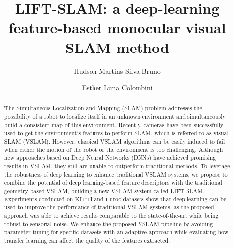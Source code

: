 \documentclass[preprint,12pt]{elsarticle}
\begin{document}
\begin{frontmatter}



\title{LIFT-SLAM: a deep-learning feature-based monocular visual SLAM method}


\author[label1]{Hudson Martins Silva Bruno}
\author[label1]{Esther Luna Colombini}

\address[label1]{Laboratory of Robotics and Cognitive Systems, Institute of Computing, State University of Campinas, Campinas, São Paulo, Brazil}
 
\begin{abstract}
The Simultaneous Localization and Mapping (SLAM) problem addresses the possibility of a robot to localize itself in an unknown environment and simultaneously build a consistent map of this environment. Recently, cameras have been successfully used to get the environment's features to perform SLAM, which is referred to as visual SLAM (VSLAM). However, classical VSLAM algorithms can be easily induced to fail when either the motion of the robot or the environment is too challenging. Although new approaches based on Deep Neural Networks (DNNs) have achieved promising results in VSLAM, they still are unable to outperform traditional methods. To leverage the robustness of deep learning to enhance traditional VSLAM systems, we propose to combine the potential of deep learning-based feature descriptors with the traditional geometry-based VSLAM, building a new VSLAM system called LIFT-SLAM. Experiments conducted on KITTI and Euroc datasets show that deep learning can be used to improve the performance of traditional VSLAM systems, as the proposed approach was able to achieve results comparable to the state-of-the-art while being robust to sensorial noise. We enhance the proposed VSLAM pipeline by avoiding parameter tuning for specific datasets with an adaptive approach while evaluating how transfer learning can affect the quality of the features extracted.
\end{abstract}


\end{frontmatter}
\end{document}
